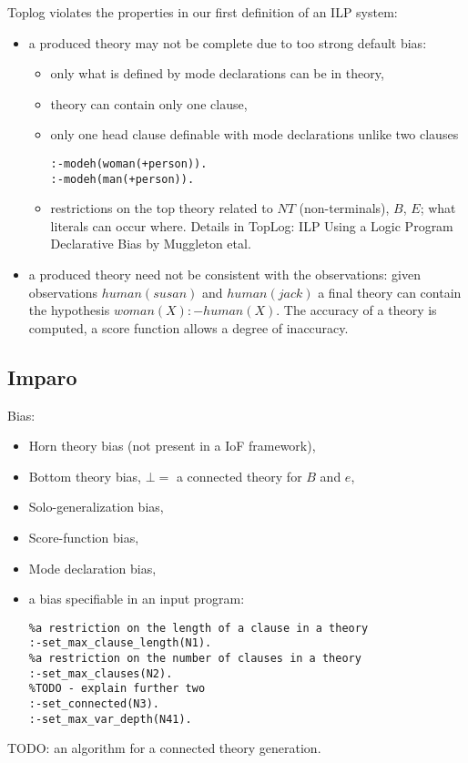 Toplog violates the properties in our first definition of an ILP system:
\begin{itemize}
\item a produced theory may not be complete due to too strong default bias:
\begin{itemize}
\item only what is defined by mode declarations can be in theory,
\item theory can contain only one clause,
\item only one head clause definable with mode declarations unlike two clauses
\begin{lstlisting}
:-modeh(woman(+person)).
:-modeh(man(+person)).
\end{lstlisting}

\item restrictions on the top theory related to $NT$ (non-terminals), $B$, $E$; what literals can occur where. Details in TopLog: ILP Using a Logic Program Declarative Bias by Muggleton etal.
\end{itemize}
\item a produced theory need not be consistent with the observations: given observations $human(susan)$ and $human(jack)$ a final theory can contain the hypothesis $woman(X) :- human(X)$. The accuracy of a theory is computed, a score function allows a degree of inaccuracy.
\end{itemize}

\iffalse
\subsection{ProGolem}
\begin{itemize}
\item Inverse Entailment,
\item co-generalization, 
\end{itemize}
\fi

\subsection{Imparo\cite{kimber2009induction}}
Bias:
\begin{itemize}
\item Horn theory bias (not present in a IoF framework),
\item Bottom theory bias, $\bot=$ a connected theory for $B$ and $e$,
\item Solo-generalization bias,
\item Score-function bias,
\item Mode declaration bias,
\item a bias specifiable in an input program:
\begin{lstlisting}
%a restriction on the length of a clause in a theory
:-set_max_clause_length(N1).
%a restriction on the number of clauses in a theory
:-set_max_clauses(N2).
%TODO - explain further two
:-set_connected(N3).
:-set_max_var_depth(N41).
\end{lstlisting}
\end{itemize}
TODO: an algorithm for a connected theory generation.


